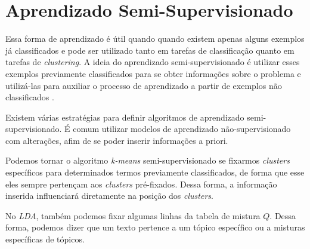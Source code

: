 \clearpage
\section{Aprendizado Semi-Supervisionado}

Essa forma de aprendizado é útil quando quando existem apenas alguns exemplos já classificados e pode ser utilizado tanto em tarefas de classificação quanto em tarefas de \textit{clustering}. A ideia do aprendizado semi-supervisionado é utilizar esses exemplos previamente classificados para se obter informações sobre o problema e utilizá-las para auxiliar o processo de aprendizado a partir de exemplos não classificados \cite{bruce}.

Existem várias estratégias para definir algoritmos de aprendizado semi-supervisionado. É comum utilizar modelos de aprendizado não-supervisionado com alterações, afim de se poder inserir informações a priori.

Podemos tornar o algoritmo \textit{k-means} semi-supervisionado se fixarmos \textit{clusters} específicos para determinados termos previamente classificados, de forma que esse eles sempre pertençam aos \textit{clusters} pré-fixados. Dessa forma, a informação inserida influenciará diretamente na posição dos \textit{clusters}.

No \textit{LDA}, também podemos fixar algumas linhas da tabela de mistura \(Q\). Dessa forma, podemos dizer que um texto pertence a um tópico específico ou a misturas específicas de tópicos.
